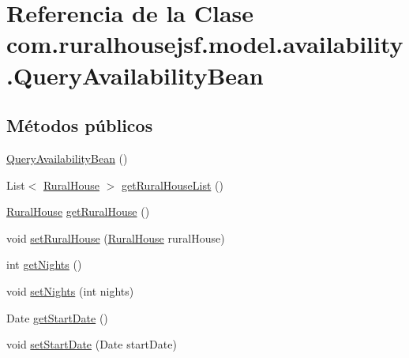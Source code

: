 \hypertarget{classcom_1_1ruralhousejsf_1_1model_1_1availability_1_1_query_availability_bean}{}\section{Referencia de la Clase com.\+ruralhousejsf.\+model.\+availability.\+Query\+Availability\+Bean}
\label{classcom_1_1ruralhousejsf_1_1model_1_1availability_1_1_query_availability_bean}
\subsection*{Métodos públicos}
\begin{DoxyCompactItemize}
\item 
\mbox{\hyperlink{classcom_1_1ruralhousejsf_1_1model_1_1availability_1_1_query_availability_bean_a774769b2abae9a936441fcb0221f3cde}{Query\+Availability\+Bean}} ()
\item 
List$<$ \mbox{\hyperlink{classcom_1_1ruralhousejsf_1_1domain_1_1_rural_house}{Rural\+House}} $>$ \mbox{\hyperlink{classcom_1_1ruralhousejsf_1_1model_1_1availability_1_1_query_availability_bean_ac3e48b7da4e958bb59c9c22d563249e2}{get\+Rural\+House\+List}} ()
\item 
\mbox{\hyperlink{classcom_1_1ruralhousejsf_1_1domain_1_1_rural_house}{Rural\+House}} \mbox{\hyperlink{classcom_1_1ruralhousejsf_1_1model_1_1availability_1_1_query_availability_bean_ad4f318a7cc2f3e1fd8577693c48c086d}{get\+Rural\+House}} ()
\item 
void \mbox{\hyperlink{classcom_1_1ruralhousejsf_1_1model_1_1availability_1_1_query_availability_bean_a0dfead1981002b06882aeeaac61b3102}{set\+Rural\+House}} (\mbox{\hyperlink{classcom_1_1ruralhousejsf_1_1domain_1_1_rural_house}{Rural\+House}} rural\+House)
\item 
int \mbox{\hyperlink{classcom_1_1ruralhousejsf_1_1model_1_1availability_1_1_query_availability_bean_aa1f5ab5e45a1c5ccba0e3195bad30ffd}{get\+Nights}} ()
\item 
void \mbox{\hyperlink{classcom_1_1ruralhousejsf_1_1model_1_1availability_1_1_query_availability_bean_a7e2cb72e616081680ef73d3e0098cfb7}{set\+Nights}} (int nights)
\item 
Date \mbox{\hyperlink{classcom_1_1ruralhousejsf_1_1model_1_1availability_1_1_query_availability_bean_ae46fcaad171bc9a64b2ab26dba2118ef}{get\+Start\+Date}} ()
\item 
void \mbox{\hyperlink{classcom_1_1ruralhousejsf_1_1model_1_1availability_1_1_query_availability_bean_aeab72b6097d8b3c356a4d2353da24eb0}{set\+Start\+Date}} (Date start\+Date)

\end{DoxyCompactItemize}
